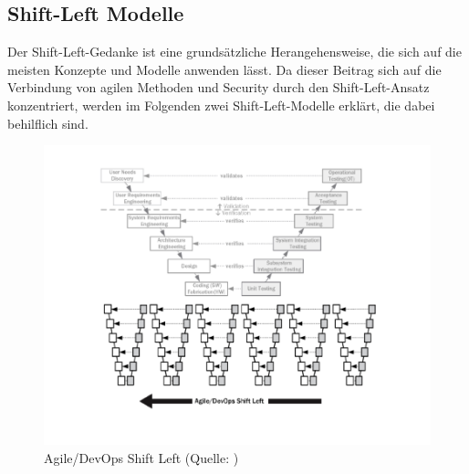 \subsection{Shift-Left Modelle}
Der Shift-Left-Gedanke ist eine grundsätzliche Herangehensweise, die sich auf die meisten Konzepte und Modelle anwenden lässt. Da dieser Beitrag sich auf die Verbindung von agilen Methoden und Security durch den Shift-Left-Ansatz konzentriert, werden im Folgenden zwei Shift-Left-Modelle erklärt, die dabei behilflich sind.

\begin{figure}
    \centering
    \includegraphics[width=0.9\linewidth]{images/Agile_DevOps_Shift_Left.png}
    \caption{Agile/DevOps Shift Left (Quelle: )}
    \label{fig:agiledevops}
\end{figure}

